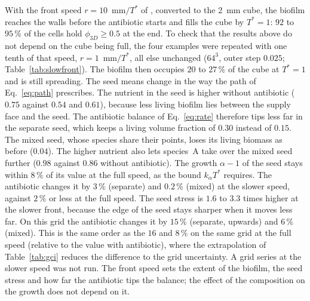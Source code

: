 \documentclass[11pt,a4paper]{article}
\newcommand{\phiD}{\phi_{3D}}
\begin{document}
With the front speed $r=10$~mm$/T^*$ of \citet{Klempt2024DiffusionDrivenGrowth}, converted to the 2~mm cube, the biofilm reaches the walls before the antibiotic starts and fills the cube by $T^*=1$: $92$ to $95\,\%$ of the cells hold $\phiD\ge0.5$ at the end. To check that the results above do not depend on the cube being full, the four examples were repeated with one tenth of that speed, $r=1$~mm$/T^*$, all else unchanged ($64^3$, outer step $0.025$; Table~\ref{tab:slowfront}). The biofilm then occupies $20$ to $27\,\%$ of the cube at $T^*=1$ and is still spreading. The seed means change in the way the path of Eq.~\eqref{eq:path} prescribes. The nutrient in the seed is higher without antibiotic ($0.75$ against $0.54$ and $0.61$), because less living biofilm lies between the supply face and the seed. The antibiotic balance of Eq.~\eqref{eq:rate} therefore tips less far in the separate seed, which keeps a living volume fraction of $0.30$ instead of $0.15$. The mixed seed, whose species share their points, loses its living biomass as before ($0.04$). The higher nutrient also lets species~A take over the mixed seed further ($0.98$ against $0.86$ without antibiotic). The growth $\alpha-1$ of the seed stays within $8\,\%$ of its value at the full speed, as the bound $k_\alpha T^*$ requires. The antibiotic changes it by $3\,\%$ (separate) and $0.2\,\%$ (mixed) at the slower speed, against $2\,\%$ or less at the full speed. The seed stress is $1.6$ to $3.3$ times higher at the slower front, because the edge of the seed stays sharper when it moves less far. On this grid the antibiotic changes it by $15\,\%$ (separate, upwards) and $6\,\%$ (mixed). This is the same order as the $16$ and $8\,\%$ on the same grid at the full speed (relative to the value with antibiotic), where the extrapolation of Table~\ref{tab:gci} reduces the difference to the grid uncertainty. A grid series at the slower speed was not run. The front speed sets the extent of the biofilm, the seed stress and how far the antibiotic tips the balance; the effect of the composition on the growth does not depend on it.
\end{document}

